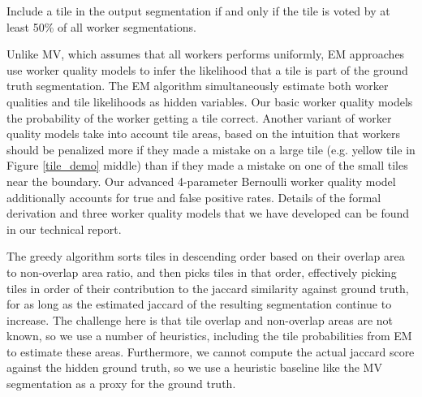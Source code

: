 \par \noindent Include a tile in the output segmentation if and only if the tile is voted by at least 50\% of all worker segmentations.

\par \noindent Unlike MV, which assumes that all workers performs uniformly, EM approaches use worker quality models to infer the likelihood that a tile is part of the ground truth segmentation. The EM algorithm simultaneously estimate both worker qualities and tile likelihoods as hidden variables. Our basic worker quality models the probability of the worker getting a tile correct. Another variant of worker quality models take into account tile areas, based on the intuition that workers should be penalized more if they made a mistake on a large tile (e.g. yellow tile in Figure \ref{tile_demo} middle) than if they made a mistake on one of the small tiles near the boundary. Our advanced 4-parameter Bernoulli worker quality model additionally accounts for true and false positive rates. Details of the formal derivation and three worker quality models that we have developed can be found in our technical report.

\par \noindent The greedy algorithm sorts tiles in descending order based on their overlap area to non-overlap area ratio, and then picks tiles in that order, effectively picking tiles in order of their contribution to the jaccard similarity against ground truth, for as long as the estimated jaccard of the resulting segmentation continue to increase.  The challenge here is that tile overlap and non-overlap areas are not known, so we use a number of heuristics, including the tile probabilities from EM to estimate these areas. Furthermore, we cannot compute the actual jaccard score against the hidden ground truth, so we use a heuristic baseline like the MV segmentation as a proxy for the ground truth.


